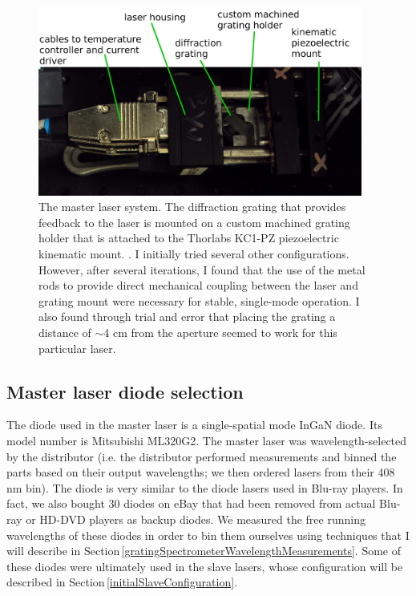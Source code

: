 \begin{figure}
\centerline{
\includegraphics[width=0.95\textwidth]{master_laser.JPG}}
\caption[Photograph of master laser]{\label{master_laser_photo} The master laser system. The diffraction grating that provides feedback to the laser is mounted on a custom machined grating holder that is attached to the Thorlabs KC1-PZ piezoelectric kinematic mount. . I initially tried several other configurations. However, after several iterations, I found that the use of the metal rods to provide direct  mechanical coupling between the laser and grating mount were necessary for stable, single-mode operation. I also found through trial and error that placing the grating a distance of $\sim$4 cm from the aperture seemed to work for this particular laser.}
\end{figure}


\subsection{Master laser diode selection}
\label{masterLaserDiodes}
The diode used in the master laser is a single-spatial mode InGaN diode. Its model number is Mitsubishi ML320G2. The master laser was wavelength-selected by the distributor (i.e. the distributor performed measurements and binned the parts based on their output wavelengths; we then ordered lasers from their 408 nm bin). The diode is very similar to the diode lasers used in Blu-ray players. 
In fact, we also bought 30 diodes on eBay that had been removed from actual Blu-ray or HD-DVD players as backup diodes. We measured the free running wavelengths of these diodes in order to bin them ourselves using techniques that I will describe in Section\,\ref{gratingSpectrometerWavelengthMeasurements}. Some of these diodes were ultimately used in the slave lasers, whose configuration will be described in Section\,\ref{initialSlaveConfiguration}.


